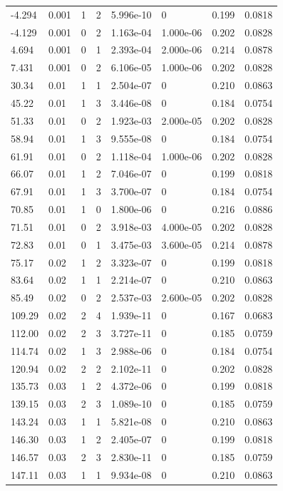 \documentclass[preview]{standalone}
\begin{document}
{{\begin{tabular}{L{1.2cm}C{1.2cm} C{0.3cm}C{0.5cm} C{1.4cm}C{1.4cm} C{1.4cm}C{1.4cm}}
  -4.294  &  0.001  & 1     &  2 &  5.996e-10  & 0  & 0.199 &  0.0818   \\ 
  -4.129  &  0.001  & 0     &  2 &  1.163e-04  & 1.000e-06  & 0.202 &  0.0828   \\ 
  4.694  &  0.001  & 0     &  1 &  2.393e-04  & 2.000e-06  & 0.214 &  0.0878   \\ 
  7.431  &  0.001  & 0     &  2 &  6.106e-05  & 1.000e-06  & 0.202 &  0.0828   \\ 
  30.34  &  0.01  & 1     &  1 &  2.504e-07  & 0  & 0.210 &  0.0863   \\ 
  45.22  &  0.01  & 1     &  3 &  3.446e-08  & 0  & 0.184 &  0.0754   \\ 
  51.33  &  0.01  & 0     &  2 &  1.923e-03  & 2.000e-05  & 0.202 &  0.0828   \\ 
  58.94  &  0.01  & 1     &  3 &  9.555e-08  & 0  & 0.184 &  0.0754   \\ 
  61.91  &  0.01  & 0     &  2 &  1.118e-04  & 1.000e-06  & 0.202 &  0.0828   \\ 
  66.07  &  0.01  & 1     &  2 &  7.046e-07  & 0  & 0.199 &  0.0818   \\ 
  67.91  &  0.01  & 1     &  3 &  3.700e-07  & 0  & 0.184 &  0.0754   \\ 
  70.85  &  0.01  & 1     &  0 &  1.800e-06  & 0  & 0.216 &  0.0886   \\ 
  71.51  &  0.01  & 0     &  2 &  3.918e-03  & 4.000e-05  & 0.202 &  0.0828   \\ 
  72.83  &  0.01  & 0     &  1 &  3.475e-03  & 3.600e-05  & 0.214 &  0.0878   \\ 
  75.17  &  0.02  & 1     &  2 &  3.323e-07  & 0  & 0.199 &  0.0818   \\ 
  83.64  &  0.02  & 1     &  1 &  2.214e-07  & 0  & 0.210 &  0.0863   \\ 
  85.49  &  0.02  & 0     &  2 &  2.537e-03  & 2.600e-05  & 0.202 &  0.0828   \\ 
  109.29  &  0.02  & 2     &  4 &  1.939e-11  & 0  & 0.167 &  0.0683   \\ 
  112.00  &  0.02  & 2     &  3 &  3.727e-11  & 0  & 0.185 &  0.0759   \\ 
  114.74  &  0.02  & 1     &  3 &  2.988e-06  & 0  & 0.184 &  0.0754   \\ 
  120.94  &  0.02  & 2     &  2 &  2.102e-11  & 0  & 0.202 &  0.0828   \\ 
  135.73  &  0.03  & 1     &  2 &  4.372e-06  & 0  & 0.199 &  0.0818   \\ 
  139.15  &  0.03  & 2     &  3 &  1.089e-10  & 0  & 0.185 &  0.0759   \\ 
  143.24  &  0.03  & 1     &  1 &  5.821e-08  & 0  & 0.210 &  0.0863   \\ 
  146.30  &  0.03  & 1     &  2 &  2.405e-07  & 0  & 0.199 &  0.0818   \\ 
  146.57  &  0.03  & 2     &  3 &  2.830e-11  & 0  & 0.185 &  0.0759   \\ 
  147.11  &  0.03  & 1     &  1 &  9.934e-08  & 0  & 0.210 &  0.0863   \\ 
\hline 
\end{tabular} 

}}
\end{document}
